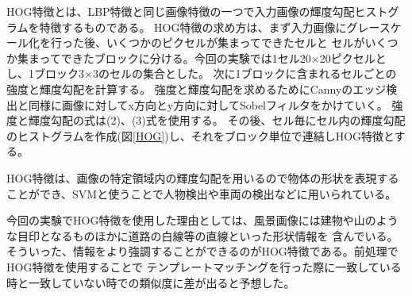 HOG特徴とは、LBP特徴と同じ画像特徴の一つで入力画像の輝度勾配ヒストグラムを特徴するものである。
HOG特徴の求め方は、まず入力画像にグレースケール化を行った後、いくつかのピクセルが集まってできたセルと
セルがいくつか集まってできたブロックに分ける。今回の実験では1セル20$\times$20ピクセルとし、1ブロック3$\times$3のセルの集合とした。
次に1ブロックに含まれるセルごとの強度と輝度勾配を計算する。
強度と輝度勾配を求めるためにCannyのエッジ検出と同様に画像に対してx方向とy方向に対してSobelフィルタをかけていく。
強度と輝度勾配の式は(2)、(3)式を使用する。
その後、セル毎にセル内の輝度勾配のヒストグラムを作成(図\ref{HOG})し、それをブロック単位で連結しHOG特徴とする。


HOG特徴は、画像の特定領域内の輝度勾配を用いるので物体の形状を表現することができ、SVMと使うことで人物検出や車両の検出などに用いられている。

今回の実験でHOG特徴を使用した理由としては、風景画像には建物や山のような目印となるものほかに道路の白線等の直線といった形状情報を
含んでいる。そういった、情報をより強調することができるのがHOG特徴である。前処理でHOG特徴を使用することで
テンプレートマッチングを行った際に一致している時と一致していない時での類似度に差が出ると予想した。